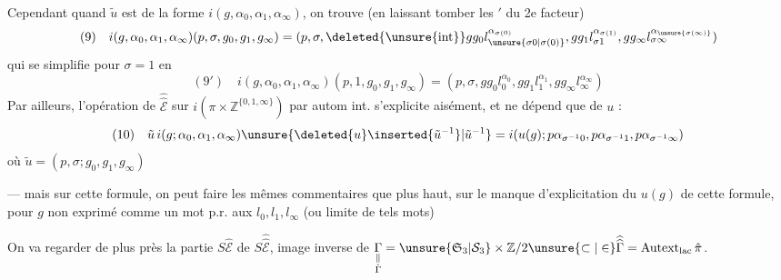 Cependant quand $\tilde u$ est de la forme $i(g,\alpha_0,\alpha_1,\alpha_\infty)$, on trouve (en laissant tomber les $'$ du 2e facteur)
\[
(9)\quad i(g,\alpha_0,\alpha_1,\alpha_\infty)(p,\sigma,g_0,g_1,g_\infty)=(p,\sigma,\deleted{\unsure{\operatorname{int}}}gg_0l_{\unsure{\sigma0|\sigma(0)}}^{\alpha_{\sigma(0)}},gg_1l_{\sigma1}^{\alpha_{\sigma(1)}},gg_\infty l_{\sigma\infty}^{\alpha_{\unsure{\sigma(\infty)}}})
\]
qui se simplifie pour $\sigma=1$ en
\[
(9')\quad i(g,\alpha_0,\alpha_1,\alpha_\infty)(p,1,g_0,g_1,g_\infty)=(p,\sigma,gg_0l_0^{\alpha_0},gg_1l_1^{\alpha_1},gg_\infty l_\infty^{\alpha_\infty})
\]
Par ailleurs, l'opération de $\widehat{\widehat{\mathcal E}}$ sur $i(\pi\times\mathbb Z^{\{0,1,\infty\}})$ par autom int. s'explicite aisément, et ne dépend que de $u$ :
\[
(10)\quad\tilde u\,i(g;\alpha_0,\alpha_1,\alpha_\infty)\unsure{\deleted{u}\inserted{\tilde u^{-1}}|\tilde u^{-1}}=i(u(g);p\alpha_{\sigma^{-1}0},p\alpha_{\sigma^{-1}1},p\alpha_{\sigma^{-1}\infty})
\]
où $\tilde u=(p,\sigma;g_0,g_1,g_\infty)$

--- mais sur cette formule, on peut faire les mêmes commentaires que plus haut, sur le manque d'explicitation du  $u(g)$ de cette formule, pour $g$ non exprimé comme un mot p.r. aux $l_0,l_1,l_\infty$ (ou limite de tels mots)

On va regarder de plus près la partie $S\hat{\mathcal E}$ de $S\widehat{\widehat{\mathcal E}}$, image inverse de
$\underset{\substack{\Vert\\\hat\Gamma}}{\Gamma}=\unsure{\mathfrak S_3|\mathcal S_3}\times\mathbb Z/2\unsure{\subset|\in}\widehat{\widehat\Gamma}=\operatorname{Autext}_{\mathrm{lac}}\hat\pi$.

